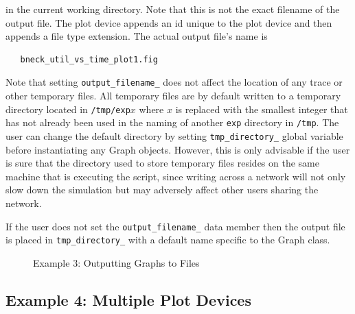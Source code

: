 \documentclass[11pt]{article}
\begin{document}
\noindent in the current working directory.  Note that this is not the exact
filename of the output file.  The plot device appends an id unique to the
plot device and then appends a file type extension.  The actual output file's
name is 

\begin{verbatim}
   bneck_util_vs_time_plot1.fig
\end{verbatim}

Note that setting \verb|output_filename_| does not affect the location
of any trace or other temporary files.  All temporary files are by
default written to a temporary directory located in \verb|/tmp/exp|$x$
where $x$ is replaced with the smallest integer that has not already been
used in the naming of another \verb|exp| directory in \verb|/tmp|.
The user can change the default directory by setting
\verb|tmp_directory_| global variable before instantiating any Graph
objects.  However, this is only advisable if the user is sure that the
directory used to store temporary files resides on the same machine
that is executing the script, since writing across a network will not
only slow down the simulation but may adversely affect other users
sharing the network.  

If the user does not set the \verb|output_filename_| data member then
the output file is placed in \verb|tmp_directory_| with a default
name specific to the Graph class.

\begin{figure}[ht]
\begin{center}
\end{center}
\caption{Example 3: Outputting Graphs to Files}\label{Ex3Figure}
\end{figure}

\subsection{Example 4: Multiple Plot Devices}
\end{document}
